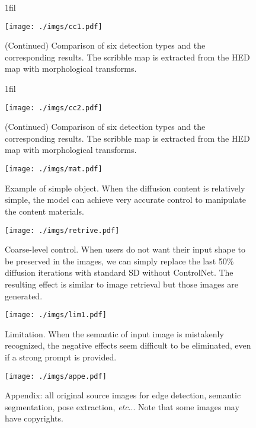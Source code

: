 \documentclass{article}
\makeatletter
\DeclareRobustCommand\onedot{\futurelet\@let@token\@onedot}
\def\@onedot{\ifx\@let@token.\else.\null\fi\xspace}
\def\etc{\emph{etc}\onedot}
\newcommand*{\centerfloat}{%
	\parindent \z@
	\leftskip \z@ \@plus 1fil \@minus \textwidth
	\rightskip\leftskip
	\parfillskip \z@skip}
\makeatother
\begin{document}
\begin{figure}
	\centerfloat
	\begin{minipage}{1.4\linewidth}
		\texttt{[image: ./imgs/cc1.pdf]}
	\caption{(Continued) Comparison of six detection types and the corresponding results. The scribble map is extracted from the HED map with morphological transforms.}
	\label{fig:cc1} 	\end{minipage}

\end{figure}

\begin{figure}
	\centerfloat
	\begin{minipage}{1.4\linewidth}
		\texttt{[image: ./imgs/cc2.pdf]}
	\caption{(Continued) Comparison of six detection types and the corresponding results. The scribble map is extracted from the HED map with morphological transforms.}
	\label{fig:cc2} 	\end{minipage}

\end{figure}

\begin{figure}
	\centering
	\texttt{[image: ./imgs/mat.pdf]}
	\caption{Example of simple object. When the diffusion content is relatively simple, the model can achieve very accurate control to manipulate the content materials.}
	\label{fig:mat} 
\end{figure}

\begin{figure}
	\centering
	\texttt{[image: ./imgs/retrive.pdf]}
	\caption{Coarse-level control. When users do not want their input shape to be preserved in the images, we can simply replace the last 50\% diffusion iterations with standard SD without ControlNet. The resulting effect is similar to image retrieval but those images are generated.}
	\label{fig:retrive} 
\end{figure}

\begin{figure}
	\centering
	\texttt{[image: ./imgs/lim1.pdf]}
	\caption{Limitation. When the semantic of input image is mistakenly recognized, the negative effects seem difficult to be eliminated, even if a strong prompt is provided.}
	\label{fig:lim1} 
\end{figure}

\begin{figure}
	\centering
	\texttt{[image: ./imgs/appe.pdf]}
	\caption{Appendix: all original source images for edge detection, semantic segmentation, pose extraction, \etc. Note that some images may have copyrights.}
	\label{fig:appe} 
\end{figure}



\end{document}
